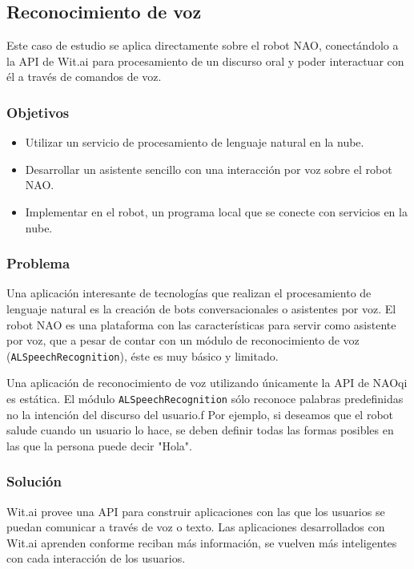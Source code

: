 \subsection{Reconocimiento de voz}

Este caso de estudio se aplica
directamente sobre el robot NAO, conectándolo
a la API de Wit.ai para procesamiento de
un discurso oral y poder interactuar con él a través de comandos de voz.


\subsubsection{Objetivos}

\begin{itemize}

    \item Utilizar un servicio de procesamiento
    de lenguaje natural en la nube.
    \item Desarrollar un asistente sencillo con una interacción por voz sobre el robot NAO.
    \item Implementar en el robot, un programa local
    que se conecte con servicios en la nube.
    
\end{itemize}

\subsubsection{Problema}


Una aplicación interesante de tecnologías que realizan el
procesamiento de lenguaje natural es la creación de bots conversacionales
o asistentes por voz.
El robot NAO es una plataforma con las características
para servir como asistente por voz, que a pesar de contar con un
módulo de reconocimiento de voz (\texttt{ALSpeechRecognition}), éste es muy 
básico y limitado.

Una aplicación de reconocimiento de voz
utilizando únicamente la API de NAOqi es estática.
El módulo \texttt{ALSpeechRecognition} sólo reconoce
palabras predefinidas no la intención
del discurso del usuario.f
Por ejemplo, si deseamos que el robot salude
cuando un usuario lo hace, se deben 
definir todas las formas posibles en las que
la persona puede decir "Hola".

\subsubsection{Solución}

Wit.ai provee una API para construir aplicaciones
con las que los usuarios se puedan comunicar a través de voz o texto.
Las aplicaciones desarrollados con Wit.ai aprenden conforme reciban más 
información, se vuelven más inteligentes con cada interacción de los usuarios.

